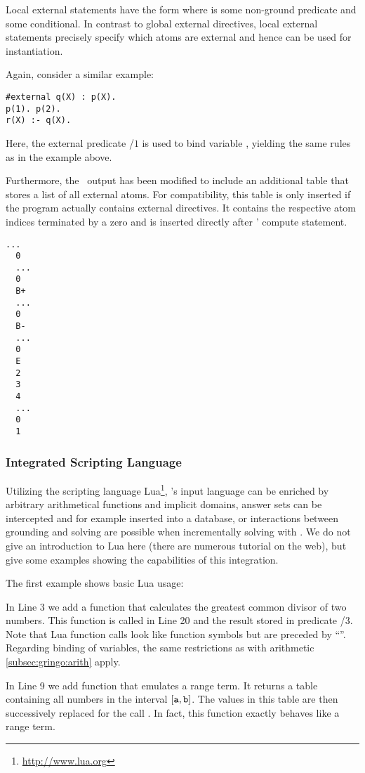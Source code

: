 Local external statements have the form  where
 is some non-ground predicate and  some conditional.
In contrast to global external directives, local external statements precisely specify 
which atoms are external and hence can be used for instantiation.
\begin{example}
Again, consider a similar example:
\begin{lstlisting}[numbers=none]
#external q(X) : p(X).
p(1). p(2).
r(X) :- q(X).
\end{lstlisting}
Here, the external predicate /$1$ is used to bind variable , 
yielding the same rules as in the example above.
\eexample
\end{example}

Furthermore, the \lparse\ output\cite{lparseManual} has been modified to include an additional table 
that stores a list  of all external atoms. For compatibility, this table is only inserted if the 
program actually contains external directives. It contains the respective atom indices terminated
by a zero and is inserted directly after \lparse' compute statement.
\begin{lstlisting}[numbers=none]
  ...
  0
  ...
  0
  B+
  ...
  0
  B-
  ...
  0
  E
  2
  3
  4
  ...
  0
  1
\end{lstlisting}

\subsubsection{Integrated Scripting Language}\label{subsec:lang:lua}
Utilizing the scripting language Lua\footnote{\url{http://www.lua.org}}, 
\gringo's input language can be enriched by arbitrary arithmetical functions and implicit domains,
answer sets can be intercepted and for example inserted into a database, or
interactions between grounding and solving are possible when incrementally solving with \iclingo.
We do not give an introduction to Lua here (there are numerous tutorial on the web), 
but give some examples showing the capabilities of this integration.

\begin{example}
The first example shows basic Lua usage:

%
In Line 3 we add a function that calculates the greatest common divisor of two numbers.
This function is called in Line 20 and the result stored in predicate /$3$.
Note that Lua function calls look like function symbols but are preceded by ``''.
Regarding binding of variables, the same restrictions as with arithmetic \ref{subsec:gringo:arith} apply.

In Line 9 we add function that emulates a range term.
It returns a table containing all numbers in the interval $[\texttt{a},\texttt{b}]$.
The values in this table are then successively replaced for the call .
In fact, this function exactly behaves like a range term.
\eexample
\end{example}

